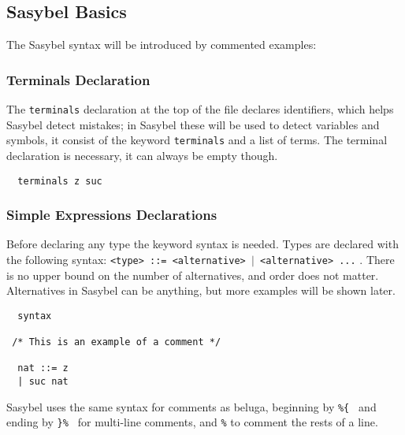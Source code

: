 \documentclass[12pt]{article}
\begin{document}
\subsection{Sasybel Basics}

The \textmd{Sasybel} syntax will be introduced by commented examples:
\subsubsection{Terminals Declaration}
The {\tt terminals} declaration at the top of the file declares identifiers, which helps \textmd{Sasybel} detect mistakes; in \textmd{Sasybel} these 
will be used to detect variables and symbols, it consist of the keyword {\tt terminals} and a list of terms. 
The terminal declaration is necessary, it can always be empty though.
\begin{verbatim}
  terminals z suc
\end{verbatim}
\subsubsection{Simple Expressions Declarations}
Before declaring any type the keyword syntax is needed. Types are declared with the following syntax: {\tt <type> ::= <alternative> $\vert$ <alternative> ...} . There is no upper bound 
on the number of alternatives, and order does not matter. Alternatives in \textmd{Sasybel} can be anything, but more examples will be shown later.
\begin{verbatim}
  syntax

 /* This is an example of a comment */

  nat ::= z
  | suc nat

\end{verbatim}
\textmd{Sasybel} uses the same syntax for comments as beluga, beginning by {\tt \%\{ } and ending by {\tt \}\% } for multi-line comments, and {\tt \%} to comment the rests of a line.
\end{document}
